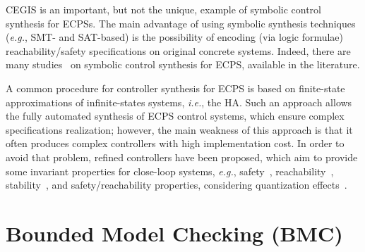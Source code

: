\documentclass[format=acmsmall, review=false, screen=true]{acmart}
\begin{document}
CEGIS is an important, but not the unique, example of symbolic control synthesis for ECPSs. The main advantage of using symbolic synthesis techniques ({\it e.g.}, SMT- and SAT-based) is the possibility of encoding (via logic formulae) reachability/safety specifications on original concrete systems. Indeed, there are many studies~\cite{Rungger13,AydinGol14,Holub16,Tabuada08,Zamani17,Zamani14,Zamani13,Zamani12,Alkhatib17,Lesser15,Girard13} on symbolic control synthesis for ECPS, available in the literature.

A common procedure for controller synthesis for ECPS is based on finite-state approximations of infinite-states systems, {\it i.e.}, the HA. Such an approach allows the fully automated synthesis of ECPS control systems, which ensure complex specifications realization; however, the main weakness of this approach is that it often produces complex controllers with high implementation cost. In order to avoid that problem, refined controllers have been proposed, which aim to provide some invariant properties for close-loop systems, {\it e.g.}, safety~\cite{Dallal17,Dallal13,Girard13}, reachability~\cite{Alkhatib17,Habets06}, stability~\cite{Zamani12,Tabuada08}, and safety/reachability properties, considering quantization effects~\cite{Reissig17}.



\section{Bounded Model Checking (BMC)}
\label{Preliminaries}
\end{document}
